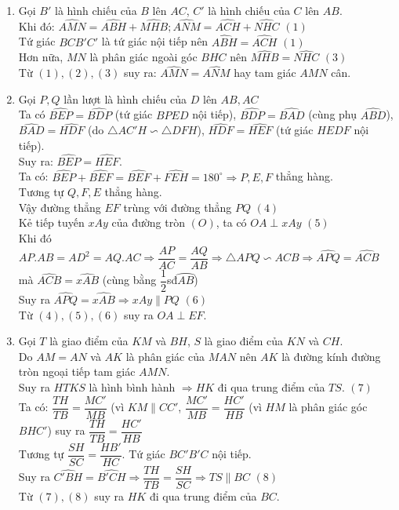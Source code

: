 \begin{ex}
{\begin{enumerate}
\item Gọi $B'$ là hình chiếu của $B$ lên $AC$, $C'$ là hình chiếu của $C$ lên $AB$.\\
Khi đó: $\widehat{AMN}=\widehat{ABH}+\widehat{MHB}; \widehat{ANM}=\widehat{ACH}+\widehat{NHC}$ \quad $(1)$\\
Tứ giác $BCB'C'$ là tứ giác nội tiếp nên $\widehat{ABH}=\widehat{ACH}$ \quad $(1)$\\
Hơn nữa, $MN$ là phân giác ngoài góc $BHC$ nên $\widehat{MHB}=\widehat{NHC}$ \quad $(3)$\\
Từ $(1),(2),(3)$ suy ra: $\widehat{AMN}=\widehat{ANM}$ hay tam giác $AMN$ cân.
\item Gọi $P,Q$ lần lượt là hình chiếu của $D$ lên $AB,AC$\\
Ta có $\widehat{BEP}=\widehat{BDP}$ (tứ giác $BPED$ nội tiếp), $\widehat{BDP}=\widehat{BAD}$ (cùng phụ $\widehat{ABD}$), $\widehat{BAD}=\widehat{HDF}$ (do $\triangle AC'H \backsim \triangle DFH$), $\widehat{HDF}=\widehat{HEF}$ (tứ giác $HEDF$ nội tiếp).\\
Suy ra: $\widehat{BEP}=\widehat{HEF}.$\\
Ta có: $\widehat{BEP}+\widehat{BEF}=\widehat{BEF}+\widehat{FEH}=180^{\circ}\Rightarrow P,E,F$ thẳng hàng.\\
Tương tự $Q,F,E$ thẳng hàng.\\
Vậy đường thẳng $EF$ trùng với đường thẳng $PQ$ \quad $(4)$\\
Kẻ tiếp tuyến $xAy$ của đường tròn $(O)$, ta có $OA\perp xAy$ \quad $(5)$\\
Khi đó $AP.AB=AD^{2}=AQ.AC\Rightarrow \dfrac{AP}{AC}=\dfrac{AQ}{AB}\Rightarrow \triangle APQ \backsim ACB \Rightarrow \widehat{APQ}=\widehat{ACB}$ mà $\widehat{ACB}=\widehat{xAB}$ (cùng bằng $\dfrac{1}{2}$sđ$\wideparen{AB}$)\\
Suy ra $\widehat{APQ}=\widehat{xAB}\Rightarrow xAy\parallel PQ$ \quad $(6)$\\
Từ $(4),(5),(6)$ suy ra $OA\perp EF$.
\item Gọi $T$ là giao điểm của $KM$ và $BH$, $S$ là giao điểm của $KN$ và $CH$.\\
Do $AM=AN$ và $AK$ là phân giác của $MAN$ nên $AK$ là đường kính đường tròn ngoại tiếp tam giác $AMN$.\\
Suy ra $HTKS$ là hình bình hành $\Rightarrow HK$ đi qua trung điểm của $TS$. \quad $(7)$\\
Ta có: $\dfrac{TH}{TB}=\dfrac{MC'}{MB}$ (vì $KM\parallel CC'$, $\dfrac{MC'}{MB}=\dfrac{HC'}{HB}$ (vì $HM$ là phân giác góc $BHC'$) suy ra $\dfrac{TH}{TB}=\dfrac{HC'}{HB}$\\
Tương tự $\dfrac{SH}{SC}=\dfrac{HB'}{HC}.$ Tứ giác $BC'B'C$ nội tiếp.\\
Suy ra $\widehat{C'BH}=\widehat{B'CH}\Rightarrow \dfrac{TH}{TB}=\dfrac{SH}{SC}\Rightarrow TS\parallel BC$ \quad $(8)$\\
Từ $(7),(8)$ suy ra $HK$ đi qua trung điểm của $BC.$
    \end{enumerate}
    }
\end{ex}

